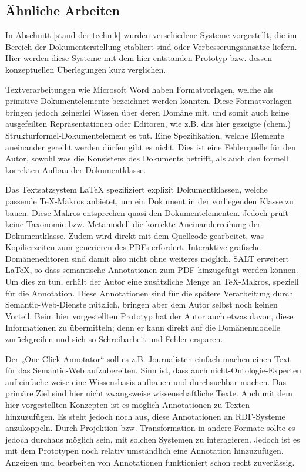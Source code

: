 \subsection{Ähnliche Arbeiten}\label{}
 
In Abschnitt \ref{stand-der-technik} wurden verschiedene Systeme vorgestellt, die im Bereich der Dokumenterstellung etabliert sind oder Verbesserungsansätze liefern. Hier werden diese Systeme mit dem hier entstanden Prototyp bzw. dessen konzeptuellen Überlegungen kurz verglichen.

 
Textverarbeitungen wie Microsoft Word haben Formatvorlagen, welche als primitive Dokumentelemente bezeichnet werden könnten. Diese Formatvorlagen bringen jedoch keinerlei Wissen über deren Domäne mit, und somit auch keine ausgefeilten Repräsentationen oder Editoren, wie z.B. das hier gezeigte (chem.) Strukturformel-Dokumentelement es tut. Eine Spezifikation, welche Elemente aneinander gereiht werden dürfen gibt es nicht. Dies ist eine Fehlerquelle für den Autor, sowohl was die Konsistenz des Dokuments betrifft, als auch den formell korrekten Aufbau der Dokumentklasse.

 
Das Textsatzsystem LaTeX spezifiziert explizit Dokumentklassen, welche passende TeX-Makros anbietet, um ein Dokument in der vorliegenden Klasse zu bauen. Diese Makros entsprechen quasi den Dokumentelementen. Jedoch prüft keine Taxonomie bzw. Metamodell die korrekte Aneinanderreihung der Dokumentklasse. Zudem wird direkt mit dem Quellcode gearbeitet, was Kopilierzeiten zum generieren des PDFs erfordert. Interaktive grafische Domäneneditoren sind damit also nicht ohne weiteres möglich. SALT \citep{Groza} erweitert LaTeX, so dass semantische Annotationen zum PDF hinzugefügt werden können. Um dies zu tun, erhält der Autor eine zusätzliche Menge an TeX-Makros, speziell für die Annotation. Diese Annotationen sind für die spätere Verarbeitung durch Semantic-Web-Dienste nützlich, bringen aber dem Autor selbst noch keinen Vorteil. Beim hier vorgestellten Prototyp hat der Autor auch etwas davon, diese Informationen zu übermitteln; denn er kann direkt auf die Domänenmodelle zurückgreifen und sich so Schreibarbeit und Fehler ersparen.

 
Der „One Click Annotator“ \citep{Heese} soll es z.B. Journalisten einfach machen einen Text für das Semantic-Web aufzubereiten. Sinn ist, dass auch nicht-Ontologie-Experten auf einfache weise eine Wissensbasis aufbauen und durchsuchbar machen. Das primäre Ziel sind hier nicht zwangsweise wissenschaftliche Texte. Auch mit dem hier vorgestellten Konzepten ist es möglich Annotationen zu Texten hinzuzufügen. Es steht jedoch noch aus, diese Annotationen an RDF-Systeme anzukoppeln. Durch Projektion bzw. Transformation in andere Formate sollte es jedoch durchaus möglich sein, mit solchen Systemen zu interagieren. Jedoch ist es mit dem Prototypen noch relativ umständlich eine Annotation hinzuzufügen. Anzeigen und bearbeiten von Annotationen funktioniert schon recht zuverlässig.

